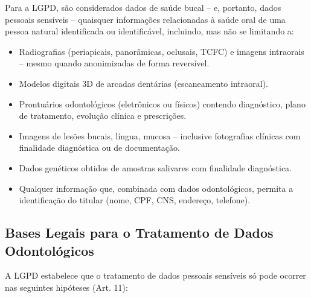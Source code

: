 Para a LGPD, são considerados dados de saúde bucal -- e, portanto, dados
pessoais sensíveis -- quaisquer informações relacionadas à saúde oral de uma
pessoa natural identificada ou identificável, incluindo, mas não se limitando a:

\begin{itemize}
  \item Radiografias (periapicais, panorâmicas, oclusais, TCFC) e imagens
    intraorais -- mesmo quando anonimizadas de forma reversível.
  \item Modelos digitais 3D de arcadas dentárias (escaneamento intraoral).
  \item Prontuários odontológicos (eletrônicos ou físicos) contendo diagnóstico,
    plano de tratamento, evolução clínica e prescrições.
  \item Imagens de lesões bucais, língua, mucosa -- inclusive fotografias
    clínicas com finalidade diagnóstica ou de documentação.
  \item Dados genéticos obtidos de amostras salivares com finalidade diagnóstica.
  \item Qualquer informação que, combinada com dados odontológicos, permita a
    identificação do titular (nome, CPF, CNS, endereço, telefone).
\end{itemize}


\subsection{Bases Legais para o Tratamento de Dados Odontológicos}

A LGPD estabelece que o tratamento de dados pessoais sensíveis só pode ocorrer
nas seguintes hipóteses (Art. 11):

